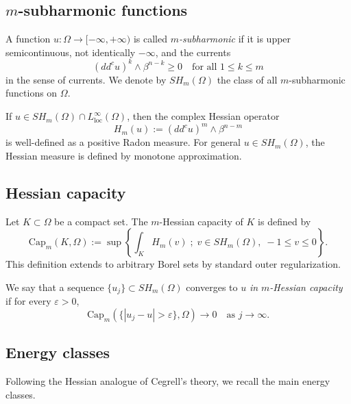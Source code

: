\documentclass[11pt,reqno]{amsart}
\theoremstyle{definition}
\theoremstyle{remark}
\newcommand{\ddc}{dd^c}
\begin{document}
	\subsection{$m$-subharmonic functions}
	
	A function $u : \Omega \to [-\infty,+\infty)$ is called \emph{$m$-subharmonic} if it is upper semicontinuous, not identically $-\infty$, and the currents
	\[
	(\ddc u)^k \wedge \beta^{n-k} \ge 0
	\quad \text{for all } 1 \le k \le m
	\]
	in the sense of currents.
	We denote by $SH_m(\Omega)$ the class of all $m$-subharmonic functions on $\Omega$.
	
	If $u \in SH_m(\Omega) \cap L^\infty_{\mathrm{loc}}(\Omega)$, then the complex Hessian operator
	\[
	H_m(u) := (\ddc u)^m \wedge \beta^{n-m}
	\]
	is well-defined as a positive Radon measure.
	For general $u \in SH_m(\Omega)$, the Hessian measure is defined by monotone approximation.
	
	
	\subsection{Hessian capacity}
	
	Let $K \subset \Omega$ be a compact set.
	The $m$-Hessian capacity of $K$ is defined by
	\[
	\mathrm{Cap}_m(K,\Omega)
	:= \sup \left\{ \int_K H_m(v) \; ; \;
	v \in SH_m(\Omega),\; -1 \le v \le 0 \right\}.
	\]
	This definition extends to arbitrary Borel sets by standard outer regularization.
	
	We say that a sequence $\{u_j\} \subset SH_m(\Omega)$ converges to $u$ \emph{in $m$-Hessian capacity} if for every $\varepsilon > 0$,
	\[
	\mathrm{Cap}_m\left( \{ |u_j - u| > \varepsilon \}, \Omega \right) \longrightarrow 0
	\quad \text{as } j \to \infty.
	\]
	
	
	\subsection{Energy classes}
	
	Following the Hessian analogue of Cegrell's theory, we recall the main energy classes.
	
\end{document}
